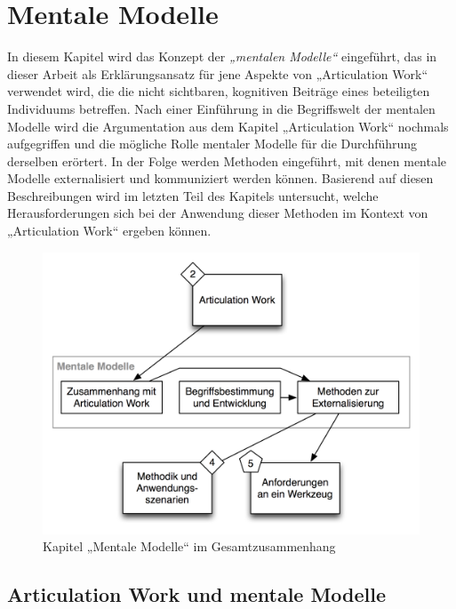 
\chapter{Mentale Modelle} %
\label{cha:mentale_modelle}

In diesem Kapitel wird das Konzept der \emph{„mentalen Modelle“} eingeführt, das in dieser Arbeit als Erklärungsansatz für jene Aspekte von „Articulation Work“ verwendet wird, die die nicht sichtbaren, kognitiven Beiträge eines beteiligten Individuums betreffen. Nach einer Einführung in die Begriffswelt der mentalen Modelle wird die Argumentation aus dem Kapitel „Articulation Work“ nochmals aufgegriffen und die mögliche Rolle mentaler Modelle für die Durchführung derselben erörtert. In der Folge werden Methoden eingeführt, mit denen mentale Modelle externalisiert und kommuniziert werden können. Basierend auf diesen Beschreibungen wird im letzten Teil des Kapitels untersucht, welche Herausforderungen sich bei der Anwendung dieser Methoden im Kontext von „Articulation Work“ ergeben können.

\begin{figure}[htbp]
	\centering
		\includegraphics[scale=0.75]{img/Kontextgrafiken/k3.png}
	\caption{Kapitel „Mentale Modelle“ im Gesamtzusammenhang}
	\label{fig:img_Kontextgrafiken_k3}
\end{figure}

\section{Articulation Work und mentale Modelle} %
\label{sec:articulation_work_und_mentale_modelle}

